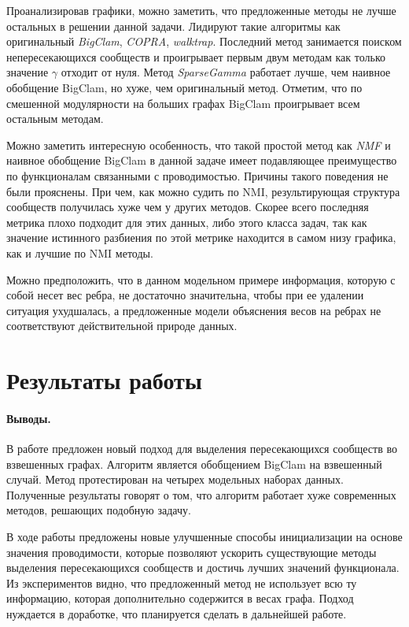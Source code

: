 \documentclass{ITaSconf}
\begin{document}
Проанализировав графики, можно заметить, что предложенные методы не лучше остальных в решении данной задачи. Лидируют такие алгоритмы как оригинальный \textit{BigClam}, \textit{COPRA}, \textit{walktrap}. Последний метод занимается поиском непересекающихся сообществ и проигрывает первым двум методам как только значение $\gamma$ отходит от нуля.
Метод \textit{SparseGamma} работает лучше, чем наивное обобщение BigClam, но хуже, чем оригинальный метод. 
Отметим, что по смешенной модулярности на больших графах BigClam проигрывает всем остальным методам. 

Можно заметить интересную особенность, что такой простой метод как \textit{NMF} и наивное обобщение BigClam в данной задаче имеет подавляющее преимущество по функционалам связанными с проводимостью. Причины такого поведения не были прояснены.
При чем, как можно судить по NMI, результирующая структура сообществ получилась хуже чем у других методов. 
Скорее всего последняя метрика плохо подходит для этих данных, либо этого класса задач, так как значение истинного разбиения по этой метрике находится в самом низу графика, как и лучшие по NMI методы.

Можно предположить, что в данном модельном примере информация, которую с собой несет вес ребра, не достаточно значительна, чтобы при ее удалении ситуация ухудшалась, а предложенные модели объяснения весов на ребрах не соответствуют действительной природе данных.

\section{Результаты работы}

\paragraph{Выводы.}
В работе предложен новый подход для выделения пересекающихся сообществ во взвешенных графах. 
Алгоритм является обобщением BigClam на взвешенный случай.
Метод протестирован на четырех модельных наборах данных. 
Полученные результаты говорят о том, что алгоритм работает хуже современных методов, решающих подобную задачу. 

В ходе работы предложены новые улучшенные способы инициализации на основе значения проводимости, которые позволяют ускорить существующие методы выделения пересекающихся сообществ и достичь лучших значений функционала.
Из экспериментов видно, что предложенный метод не использует всю ту информацию, которая дополнительно содержится в весах графа. 
Подход нуждается в доработке, что планируется сделать в дальнейшей работе.



\end{document}
